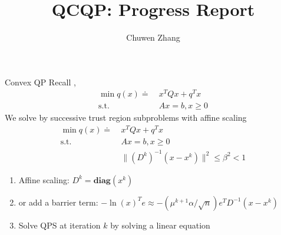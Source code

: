 \documentclass{beamerswitch}
\title{QCQP: Progress Report}
\newcommand{\diag}{\textbf{diag}}
\newcommand{\st}{\mathrm{s.t.\;}}
\begin{document}
\author{
  Chuwen Zhang
}
\frame{\titlepage}

\begin{frame}[allowframebreaks]{Convex QP}
  Recall \cite{ye_extension_1989}, \cite{ye_affine_1992}
  \begin{align*}
    \min q(x)\doteq ~ & x^TQx + q^Tx    \\
    \st             ~ & Ax = b, x \ge 0
  \end{align*}
  We solve by successive trust region subproblems with affine scaling
  \begin{align*}
    \min q(x)\doteq ~ & x^TQx + q^Tx                               \\
    \st             ~ & Ax = b, x \ge 0                            \\
                      & \|(D^k)^{-1}(x - x^k)\|^2  \le \beta^2 < 1
  \end{align*}

  \begin{enumerate}
    \item  Affine scaling: \(D^k = \diag(x^k)\)
    \item  or add a barrier term: \(- \ln(x)^Te \approx - \left(\mu^{k+1} \alpha / \sqrt{n}\right) e^{T} D^{-1}\left(x-x^{k}\right)\)
    \item  Solve QPS at iteration \(k\) by solving a linear equation
  \end{enumerate}
\end{frame}
\end{document}
